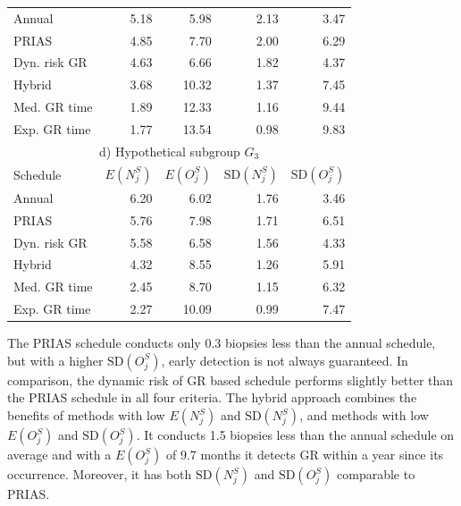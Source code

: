 \begin{table}
\begin{tabular}{lrrrr}
\hline
Annual         & 5.18            & 5.98                & 2.13          & 3.47              \\
PRIAS          & 4.85            & 7.70                & 2.00          & 6.29        \\
Dyn. risk GR       & 4.63            & 6.66                & 1.82          & 4.37              \\
Hybrid       & 3.68            & 10.32                & 1.37          & 7.45              \\
Med. GR time & 1.89             & 12.33               & 1.16          & 9.44              \\
Exp. GR time & 1.77            & 13.54               & 0.98          & 9.83              \\
\hline      
\multicolumn{5}{c}{d) Hypothetical subgroup $G_3$}\\
\hline
Schedule        & $E(N^S_j)$ & $E(O^S_j)$ & ${\mbox{SD}(N^S_j)}$ & ${\mbox{SD}(O^S_j)}$ \\
\hline
Annual         & 6.20             & 6.02                & 1.76          & 3.46              \\
PRIAS          & 5.76             & 7.98                & 1.71         & 6.51        \\
Dyn. risk GR       & 5.58            & 6.58                & 1.56          & 4.33              \\
Hybrid       & 4.32            & 8.55                & 1.26          & 5.91              \\
Med. GR time & 2.45            & 8.70                & 1.15          & 6.32              \\
Exp. GR time & 2.27            & 10.09               & 0.99          & 7.47              \\
\hline     
\end{tabular}
\end{table}

The PRIAS schedule conducts only 0.3 biopsies less than the annual schedule, but with a higher $\mbox{SD}(O^S_j)$, early detection is not always guaranteed. In comparison, the dynamic risk of GR based schedule performs slightly better than the PRIAS schedule in all four criteria. The hybrid approach combines the benefits of methods with low $E(N^S_j)$ and $\mbox{SD}(N^S_j)$, and methods with low $E(O^S_j)$ and $\mbox{SD}(O^S_j)$. It conducts 1.5 biopsies less than the annual schedule on average and with a $E(O^S_j)$ of 9.7 months it detects GR within a year since its occurrence. Moreover, it has both $\mbox{SD}(N^S_j)$ and $\mbox{SD}(O^S_j)$ comparable to PRIAS.

